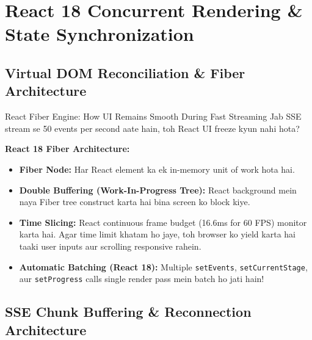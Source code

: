 \documentclass[11pt,a4paper,twoside]{report}
\begin{document}

\chapter{React 18 Concurrent Rendering \& State Synchronization}

\section{Virtual DOM Reconciliation \& Fiber Architecture}

\begin{conceptbox}{React Fiber Engine: How UI Remains Smooth During Fast Streaming}
Jab SSE stream se 50 events per second aate hain, toh React UI freeze kyun nahi hota?

\textbf{React 18 Fiber Architecture:}
\begin{itemize}
    \item \textbf{Fiber Node:} Har React element ka ek in-memory unit of work hota hai.
    \item \textbf{Double Buffering (Work-In-Progress Tree):} React background mein naya Fiber tree construct karta hai bina screen ko block kiye.
    \item \textbf{Time Slicing:} React continuous frame budget (16.6ms for 60 FPS) monitor karta hai. Agar time limit khatam ho jaye, toh browser ko yield karta hai taaki user inputs aur scrolling responsive rahein.
    \item \textbf{Automatic Batching (React 18):} Multiple \texttt{setEvents}, \texttt{setCurrentStage}, aur \texttt{setProgress} calls single render pass mein batch ho jati hain!
\end{itemize}
\end{conceptbox}

\section{SSE Chunk Buffering \& Reconnection Architecture}
\end{document}

